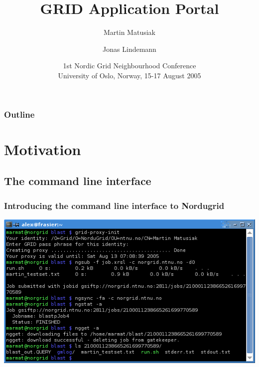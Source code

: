 \documentclass{beamer}
\title
{GRID Application Portal}
\author
{Martin Matusiak\inst{1} \and Jonas Lindemann\inst{2}}
\institute
{
  \inst{1}%
  The NTNU High Performance Computing Project\\
  Norwegian University of Science and Technology
  \and
  \inst{2}%
  Lunarc, Center for Scientific and Technical Computing\\
  Lund University}
\date[1st NGN 2005] %
{1st Nordic Grid Neighbourhood Conference\\
\footnotesize University of Oslo, Norway, 15-17 August 2005}
\begin{document}
\begin{frame}
  \titlepage
\end{frame}

\begin{frame}
  \frametitle{Outline}
  \tableofcontents
\end{frame}





\section{Motivation}



\subsection{The command line interface}

\begin{frame}
  \frametitle{Introducing the command line interface to Nordugrid}

	\includegraphics[width=\textwidth]{console_submit.png}
\end{frame}
\end{document}

